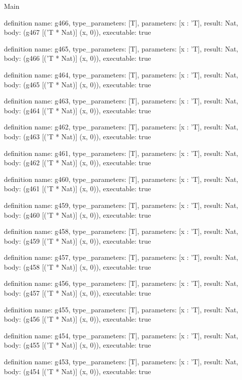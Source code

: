 \begin{lexlean}{Main}
\begin{semanticmodule}
definition{
  name: g466,
  type_parameters: [T],
  parameters: [x : 'T],
  result: Nat,
  body: (g467 [('T * Nat)] (x, 0)),
  executable: true
}

definition{
  name: g465,
  type_parameters: [T],
  parameters: [x : 'T],
  result: Nat,
  body: (g466 [('T * Nat)] (x, 0)),
  executable: true
}

definition{
  name: g464,
  type_parameters: [T],
  parameters: [x : 'T],
  result: Nat,
  body: (g465 [('T * Nat)] (x, 0)),
  executable: true
}

definition{
  name: g463,
  type_parameters: [T],
  parameters: [x : 'T],
  result: Nat,
  body: (g464 [('T * Nat)] (x, 0)),
  executable: true
}

definition{
  name: g462,
  type_parameters: [T],
  parameters: [x : 'T],
  result: Nat,
  body: (g463 [('T * Nat)] (x, 0)),
  executable: true
}

definition{
  name: g461,
  type_parameters: [T],
  parameters: [x : 'T],
  result: Nat,
  body: (g462 [('T * Nat)] (x, 0)),
  executable: true
}

definition{
  name: g460,
  type_parameters: [T],
  parameters: [x : 'T],
  result: Nat,
  body: (g461 [('T * Nat)] (x, 0)),
  executable: true
}

definition{
  name: g459,
  type_parameters: [T],
  parameters: [x : 'T],
  result: Nat,
  body: (g460 [('T * Nat)] (x, 0)),
  executable: true
}

definition{
  name: g458,
  type_parameters: [T],
  parameters: [x : 'T],
  result: Nat,
  body: (g459 [('T * Nat)] (x, 0)),
  executable: true
}

definition{
  name: g457,
  type_parameters: [T],
  parameters: [x : 'T],
  result: Nat,
  body: (g458 [('T * Nat)] (x, 0)),
  executable: true
}

definition{
  name: g456,
  type_parameters: [T],
  parameters: [x : 'T],
  result: Nat,
  body: (g457 [('T * Nat)] (x, 0)),
  executable: true
}

definition{
  name: g455,
  type_parameters: [T],
  parameters: [x : 'T],
  result: Nat,
  body: (g456 [('T * Nat)] (x, 0)),
  executable: true
}

definition{
  name: g454,
  type_parameters: [T],
  parameters: [x : 'T],
  result: Nat,
  body: (g455 [('T * Nat)] (x, 0)),
  executable: true
}

definition{
  name: g453,
  type_parameters: [T],
  parameters: [x : 'T],
  result: Nat,
  body: (g454 [('T * Nat)] (x, 0)),
  executable: true
}


\end{semanticmodule}
\end{lexlean}
